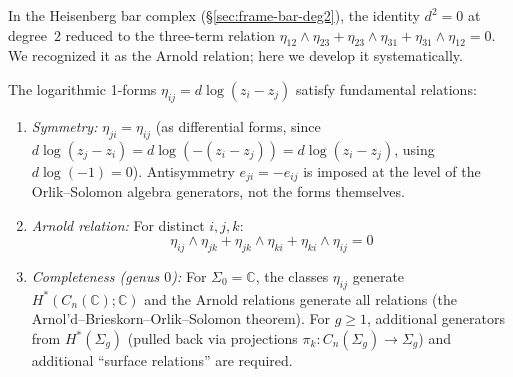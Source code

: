 \begin{theorem}\label{thm:arnold-relations}
In the Heisenberg bar complex (\S\ref{sec:frame-bar-deg2}), the identity $d^2 = 0$ at degree~$2$ reduced to the three-term relation $\eta_{12} \wedge \eta_{23} + \eta_{23} \wedge \eta_{31} + \eta_{31} \wedge \eta_{12} = 0$.  We recognized it as the Arnold relation; here we develop it systematically.

The logarithmic 1-forms $\eta_{ij} = d\log(z_i - z_j)$ satisfy fundamental relations:

\begin{enumerate}
\item \emph{Symmetry:} $\eta_{ji} = \eta_{ij}$ (as differential forms, since $d\log(z_j - z_i) = d\log(-(z_i-z_j)) = d\log(z_i-z_j)$, using $d\log(-1)=0$). Antisymmetry $e_{ji} = -e_{ij}$ is imposed at the level of the Orlik--Solomon algebra generators, not the forms themselves.

\item \emph{Arnold relation:} For distinct $i,j,k$:
\[\eta_{ij} \wedge \eta_{jk} + \eta_{jk} \wedge \eta_{ki} + \eta_{ki} \wedge \eta_{ij} = 0\]

\item \emph{Completeness (genus $0$):} For $\Sigma_0 = \mathbb{C}$, the classes $\eta_{ij}$ generate
$H^*(C_n(\mathbb{C}); \mathbb{C})$ and the Arnold relations generate all
relations (the Arnol'd--Brieskorn--Orlik--Solomon theorem).
For $g \geq 1$, additional generators from $H^*(\Sigma_g)$ (pulled back via projections $\pi_k: C_n(\Sigma_g) \to \Sigma_g$) and additional ``surface relations'' are required.
\end{enumerate}
\end{theorem}

